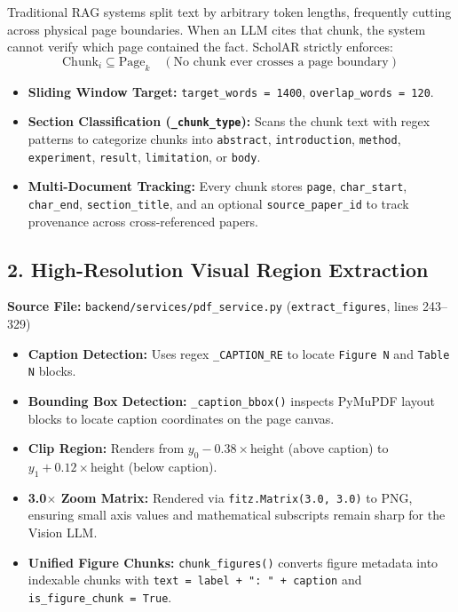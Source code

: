 \documentclass[10pt,a4paper]{article}
\begin{document}
Traditional RAG systems split text by arbitrary token lengths, frequently cutting across physical page boundaries. When an LLM cites that chunk, the system cannot verify which page contained the fact. ScholAR strictly enforces:
$$\text{Chunk}_i \subseteq \text{Page}_k \quad (\text{No chunk ever crosses a page boundary})$$

\begin{itemize}[leftmargin=1.5em, itemsep=2pt]
    \item \textbf{Sliding Window Target:} \texttt{target\_words = 1400}, \texttt{overlap\_words = 120}.
    \item \textbf{Section Classification (\texttt{\_chunk\_type}):} Scans the chunk text with regex patterns to categorize chunks into \texttt{abstract}, \texttt{introduction}, \texttt{method}, \texttt{experiment}, \texttt{result}, \texttt{limitation}, or \texttt{body}.
    \item \textbf{Multi-Document Tracking:} Every chunk stores \texttt{page}, \texttt{char\_start}, \texttt{char\_end}, \texttt{section\_title}, and an optional \texttt{source\_paper\_id} to track provenance across cross-referenced papers.
\end{itemize}

\subsection{2. High-Resolution Visual Region Extraction}
\textbf{Source File:} \texttt{backend/services/pdf\_service.py} (\texttt{extract\_figures}, lines 243--329)

\begin{itemize}[leftmargin=1.5em, itemsep=2pt]
    \item \textbf{Caption Detection:} Uses regex \texttt{\_CAPTION\_RE} to locate \texttt{Figure N} and \texttt{Table N} blocks.
    \item \textbf{Bounding Box Detection:} \texttt{\_caption\_bbox()} inspects PyMuPDF layout blocks to locate caption coordinates on the page canvas.
    \item \textbf{Clip Region:} Renders from $y_0 - 0.38 \times \text{height}$ (above caption) to $y_1 + 0.12 \times \text{height}$ (below caption).
    \item \textbf{3.0$\times$ Zoom Matrix:} Rendered via \texttt{fitz.Matrix(3.0, 3.0)} to PNG, ensuring small axis values and mathematical subscripts remain sharp for the Vision LLM.
    \item \textbf{Unified Figure Chunks:} \texttt{chunk\_figures()} converts figure metadata into indexable chunks with \texttt{text = label + ": " + caption} and \texttt{is\_figure\_chunk = True}.
\end{itemize}
\end{document}
